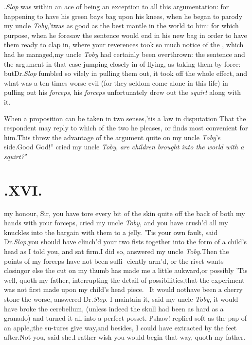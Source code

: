 \documentclass{article}
\begin{document}
.\@ \textit{Slop} was within an ace of
being an exception to all this argumentation: for happening to have
his green bays bag upon his knees, when he began to parody my
uncle \textit{Toby},\tsk ’twas as good as the best mantle in
the world to him: for which purpose, when he foresaw the sentence
would end in his new
\break
bag in order to have them ready to clap in, where your reverences
took so much notice of the \astvi, which had he
managed,\tsk my uncle \textit{Toby} had cert\-ain\-ly been
overthrown: the sentence and the argument in that case jumping
closely in 
of flying, as taking them by force: but\break Dr.\@ \textit{Slop} fumbled so vilely in
pulling them out, it took off the whole effect, and what was a ten
times worse evil (for they seldom come alone in this life) in
pulling out his \textit{forceps}, his \textit{forceps} unfortunately
drew out the \textit{squirt} along with it.

When a proposition can be taken in two senses,\tsh ’tis a
law in disputation That the respondent may reply to which
of the two he pleases, or finds most convenient for him.\tsh This
threw the advantage of the argument quite on my uncle
\textit{Toby}’s side.\tsk\lqq Good God!”
cried my uncle \textit{Toby}, \lqq\textit{are children brought into the
world with a squirt?}”

\section{.\quad  XVI.}

 my honour, Sir, you\break
have tore every bit of the skin\break
quite off the back of both my hands with your
forceps, cried my uncle \textit{Toby},\tsk\break
and you have crush’d all my knuckles into the bargain with them to a jelly. ’Tis your
own fault, said Dr.\@ \textit{Slop},\tsh you should have
clinch’d your two fists together into the form of a child’s head
as I told you, and sat firm.\tsh I did so, answered my uncle
\textit{Toby}.\tsh Then the points of my forceps have not been
suffi- ciently arm’d, or the rivet wants
closing\break\tsk or else
the cut on my thumb has made me a little aukward,\tsk or
possibly\tsk\break
’Tis well, quoth my father, interrupting the detail
of possibilities,\tsk that the ex\-periment was not first made upon
my child’s head piece. \tsh\, It would not\break have been a cherry stone
the worse, answered Dr.\@ \textit{Slop}. I maintain it, said
my uncle \textit{Toby}, it would have broke the ce\-rebellum,
(unless indeed the skull had been as hard as a granado) and
turned it all into a perfect posset. Pshaw! replied  soft as the pap of
an apple,;\tsh the su-\break tures give way,\tsk and besides, I could have
extracted by the feet after.\tsk Not you, said she.\tsk I rather
wish you would begin that way, quoth my father.
\end{document}
